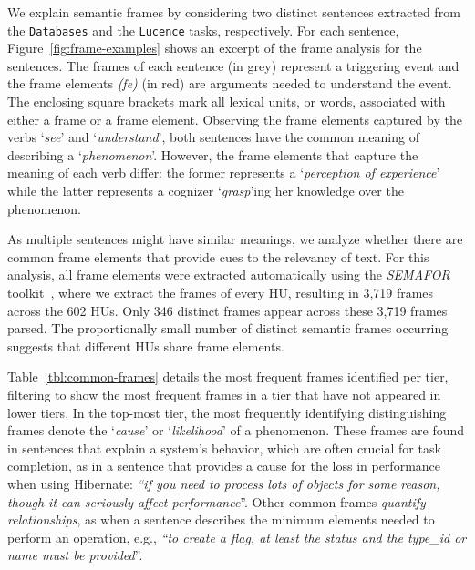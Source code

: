 We explain semantic frames by considering
 two distinct sentences extracted 
from the \texttt{Databases} and the \texttt{Lucence} tasks, respectively.
For each sentence, Figure~\ref{fig:frame-examples} shows an
excerpt of the frame analysis for the sentences. 
The frames of each sentence (in grey) represent a triggering event and the frame elements \textit{(fe)} (in red) are arguments needed to understand the event. The enclosing square brackets mark all lexical units, or words, associated with either a frame or a frame element.
Observing the frame elements captured by the verbs `\textit{see}' and
`\textit{understand}', both sentences have the common meaning of
describing a `\textit{phenomenon}'.
However, the frame elements
that capture the meaning of each verb differ: the former represents a
`\textit{perception of experience}' while the latter represents a
cognizer `\textit{grasp}'ing her knowledge over the 
phenomenon. 



As multiple sentences might have similar meanings,
we analyze whether there are common frame elements 
that provide cues to the relevancy of text.
For this analysis, all frame elements were extracted automatically
using the \textit{SEMAFOR} toolkit~\cite{das2014frame},
where we extract the frames of every HU, resulting in 3,719 frames across
the 602 HUs. Only 346 distinct frames appear across these 3,719 frames
parsed. The proportionally small number of distinct semantic frames
occurring suggests that different HUs share frame elements. 



Table~\ref{tbl:common-frames} details the most frequent frames identified per tier, filtering to show the 
most frequent frames in a tier that have not appeared in lower tiers.
In the top-most tier, the most frequently identifying distinguishing
frames denote the `\textit{cause}' or `\textit{likelihood}' of a phenomenon.
These frames are found in sentences that explain a system's behavior, which are often crucial for task completion,
as in a sentence that provides a cause for the loss in performance when using Hibernate:
 \textit{``if you need to process lots of objects for some reason, though it can seriously affect performance}''.
Other common frames \textit{quantify relationships},
as when a sentence describes the minimum elements needed to perform an operation, e.g., \textit{``to create a flag, at least the status and the type\_id or name must be provided}''.


